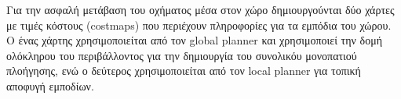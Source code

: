 Για την ασφαλή μετάβαση του οχήματος μέσα στον χώρο δημιουργούνται δύο χάρτες με τιμές κόστους (costmaps) που περιέχουν πληροφορίες για τα εμπόδια του χώρου. Ο ένας χάρτης χρησιμοποιείται από τον global planner και χρησιμοποιεί την δομή ολόκληρου του περιβάλλοντος για την δημιουργία του συνολικόυ μονοπατιού πλοήγησης, ενώ ο δεύτερος χρησιμοποιείται από τον local planner για τοπική αποφυγή εμποδίων.






